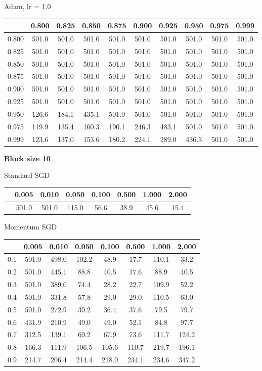 \documentclass[a4paper,14pt,oneside,openany]{memoir}
\begin{document}
	Adam, lr = 1.0 
	
	\begin{tabular}{|c|c|c|c|c|c|c|c|c|c|}
	\hline 
	 &0.800 &0.825 &0.850 &0.875 &0.900 &0.925 &0.950 &0.975 &0.999 \\
	 \hline 
	0.800 &501.0 &501.0 &501.0 &501.0 &501.0 &501.0 &501.0 &501.0 &501.0 \\
	 \hline 
	0.825 &501.0 &501.0 &501.0 &501.0 &501.0 &501.0 &501.0 &501.0 &501.0 \\
	 \hline 
	0.850 &501.0 &501.0 &501.0 &501.0 &501.0 &501.0 &501.0 &501.0 &501.0 \\
	 \hline 
	0.875 &501.0 &501.0 &501.0 &501.0 &501.0 &501.0 &501.0 &501.0 &501.0 \\
	 \hline 
	0.900 &501.0 &501.0 &501.0 &501.0 &501.0 &501.0 &501.0 &501.0 &501.0 \\
	 \hline 
	0.925 &501.0 &501.0 &501.0 &501.0 &501.0 &501.0 &501.0 &501.0 &501.0 \\
	 \hline 
	0.950 &126.6 &184.1 &435.1 &501.0 &501.0 &501.0 &501.0 &501.0 &501.0 \\
	 \hline 
	0.975 &119.9 &135.4 &160.3 &190.1 &246.3 &483.1 &501.0 &501.0 &501.0 \\
	 \hline 
	0.999 &123.6 &137.0 &153.6 &180.2 &224.1 &289.0 &436.3 &501.0 &501.0 \\
	 \hline 
	
	\end{tabular}
	
	\textbf{Block size 10} 
	
	Standard SGD 
	
	\begin{tabular}{|c|c|c|c|c|c|c|c|}
	\hline 
	 &0.005 &0.010 &0.050 &0.100 &0.500 &1.000 &2.000 \\
	 \hline 
	 &501.0 &501.0 &115.0 &56.6 &38.9 &45.6 &15.4 \\
	 \hline 
	
	\end{tabular}
	
	Momentum SGD 
	
	\begin{tabular}{|c|c|c|c|c|c|c|c|}
	\hline 
	 &0.005 &0.010 &0.050 &0.100 &0.500 &1.000 &2.000 \\
	 \hline 
	0.1 &501.0 &498.0 &102.2 &48.9 &17.7 &110.1 &33.2 \\
	 \hline 
	0.2 &501.0 &445.1 &88.8 &40.5 &17.6 &88.9 &40.5 \\
	 \hline 
	0.3 &501.0 &389.0 &74.4 &28.2 &22.7 &109.9 &52.2 \\
	 \hline 
	0.4 &501.0 &331.8 &57.8 &29.0 &29.0 &110.5 &63.0 \\
	 \hline 
	0.5 &501.0 &272.9 &39.2 &36.4 &37.6 &79.5 &79.7 \\
	 \hline 
	0.6 &431.9 &210.9 &49.0 &49.0 &52.1 &84.8 &97.7 \\
	 \hline 
	0.7 &312.5 &139.1 &69.2 &67.9 &73.6 &111.7 &124.2 \\
	 \hline 
	0.8 &166.3 &111.9 &106.5 &105.6 &110.7 &219.7 &196.1 \\
	 \hline 
	0.9 &214.7 &206.4 &214.4 &218.0 &234.1 &234.6 &347.2 \\
	 \hline 
	
	\end{tabular}
	
\end{document}
